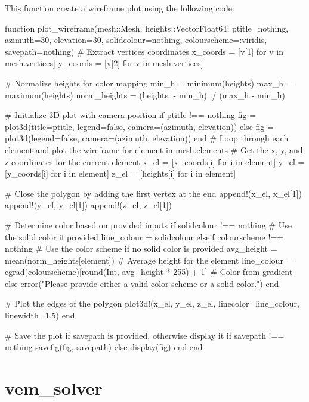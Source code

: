 \documentclass{report}
\begin{document}
This function create a wireframe plot using the following code:
\begin{jllisting}[style=JuliaStyle]
function plot_wireframe(mesh::Mesh, heights::Vector{Float64}; ptitle=nothing, azimuth=30, elevation=30, solidcolour=nothing, colourscheme=:viridis, savepath=nothing)
    # Extract vertices coordinates
    x_coords = [v[1] for v in mesh.vertices]
    y_coords = [v[2] for v in mesh.vertices]

    # Normalize heights for color mapping
    min_h = minimum(heights)
    max_h = maximum(heights)
    norm_heights = (heights .- min_h) ./ (max_h - min_h)

    # Initialize 3D plot with camera position
    if ptitle !== nothing
        fig = plot3d(title=ptitle, legend=false, camera=(azimuth, elevation))
    else
        fig = plot3d(legend=false, camera=(azimuth, elevation))
    end
    # Loop through each element and plot the wireframe
    for element in mesh.elements
        # Get the x, y, and z coordinates for the current element
        x_el = [x_coords[i] for i in element]
        y_el = [y_coords[i] for i in element]
        z_el = [heights[i] for i in element]

        # Close the polygon by adding the first vertex at the end
        append!(x_el, x_el[1])
        append!(y_el, y_el[1])
        append!(z_el, z_el[1])

        # Determine color based on provided inputs
        if solidcolour !== nothing
            # Use the solid color if provided
            line_colour = solidcolour
        elseif colourscheme !== nothing
            # Use the color scheme if no solid color is provided
            avg_height = mean(norm_heights[element])  # Average height for the element
            line_colour = cgrad(colourscheme)[round(Int, avg_height * 255) + 1]  # Color from gradient
        else
            error("Please provide either a valid color scheme or a solid color.")
        end

        # Plot the edges of the polygon
        plot3d!(x_el, y_el, z_el, linecolor=line_colour, linewidth=1.5)
    end

    # Save the plot if savepath is provided, otherwise display it
    if savepath !== nothing
        savefig(fig, savepath)
    else
        display(fig)
    end
end
\end{jllisting}


\section{vem\_solver}
\end{document}
